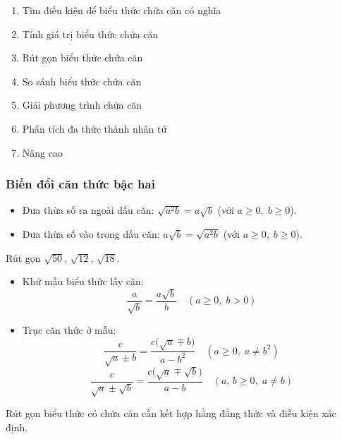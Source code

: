 \documentclass[12pt,a4paper]{article}
\begin{document}
\begin{enumerate}[label=\textbf{Dạng \arabic*:}, leftmargin=*, align=left]
  \item Tìm điều kiện để biểu thức chứa căn có nghĩa
  \item Tính giá trị biểu thức chứa căn
  \item Rút gọn biểu thức chứa căn
  \item So sánh biểu thức chứa căn
  \item Giải phương trình chứa căn
  \item Phân tích đa thức thành nhân tử
  \item Nâng cao
\end{enumerate}

\subsubsection{Biến đổi căn thức bậc hai}

\begin{congthuc}
  \begin{itemize}
    \item Đưa thừa số ra ngoài dấu căn: $\sqrt{a^2 b} = a\sqrt{b}$ \quad (với $a \ge 0,\; b \ge 0$).
    \item Đưa thừa số vào trong dấu căn: $a\sqrt{b} = \sqrt{a^2 b}$ \quad (với $a \ge 0,\; b \ge 0$).
  \end{itemize}
\end{congthuc}

\begin{vidu}
  Rút gọn $\sqrt{50}$, $\sqrt{12}$, $\sqrt{18}$.
\end{vidu}

\begin{phuongphap}[title={Khử mẫu và trục căn thức ở mẫu}]
  \begin{itemize}
    \item Khử mẫu biểu thức lấy căn:
    \[\frac{a}{\sqrt{b}} = \frac{a\sqrt{b}}{b} \quad (a \ge 0,\; b > 0)\]
    \item Trục căn thức ở mẫu:
    \[\frac{c}{\sqrt{a} \pm b} = \frac{c\bigl(\sqrt{a} \mp b\bigr)}{a - b^2} \quad (a \ge 0,\; a \neq b^2)\]
    \[\frac{c}{\sqrt{a} \pm \sqrt{b}} = \frac{c\bigl(\sqrt{a} \mp \sqrt{b}\bigr)}{a - b} \quad (a,\, b \ge 0,\; a \neq b)\]
  \end{itemize}
\end{phuongphap}

\begin{luuy}
  Rút gọn biểu thức có chứa căn cần kết hợp hằng đẳng thức và điều kiện xác định.
\end{luuy}
\end{document}
